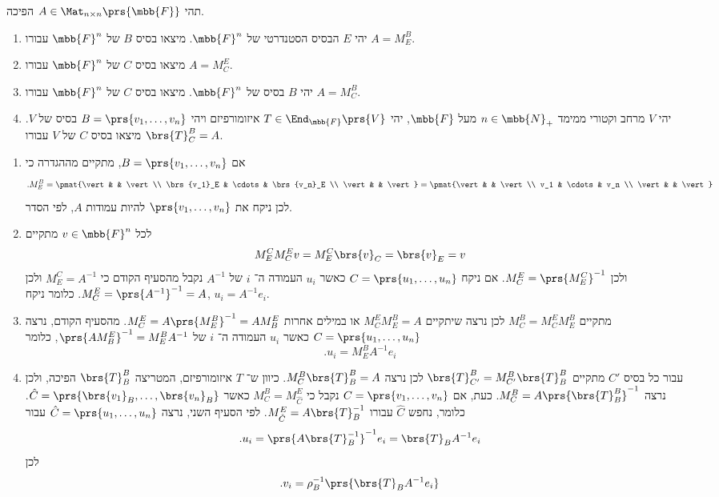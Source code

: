 \documentclass[a4paper,10pt,twoside,openany]{book}
\begin{document}
\begin{exercise}
תהי
$A \in \Mat_{n \times n}\prs{\mbb{F}}$
הפיכה.
\begin{enumerate}
\item יהי
$E$
הבסיס הסטנדרטי של
$\mbb{F}^n$.
מיצאו בסיס
$B$
של
$\mbb{F}^n$
עבורו
$A = M^B_E$.

\item
מיצאו בסיס
$C$
של
$\mbb{F}^n$
עבורו
$A = M^E_C$.

\item
יהי
$B$
בסיס של
$\mbb{F}^n$.
מיצאו בסיס
$C$
של
$\mbb{F}^n$
עבורו
$A = M^B_C$.

\item
יהי
$V$
מרחב וקטורי ממימד
$n \in \mbb{N}_+$
מעל
$\mbb{F}$,
יהי
$T \in \End_{\mbb{F}}\prs{V}$
איזומורפיזם
ויהי
$B = \prs{v_1, \ldots, v_n}$
בסיס של
$V$.
מיצאו בסיס
$C$
של
$V$
עבורו
$\brs{T}^B_C = A$.
\end{enumerate}
\end{exercise}

\begin{solution}
\begin{enumerate}
\item
אם
$B = \prs{v_1, \ldots, v_n}$,
מתקיים מההגדרה כי
\[\text{.} M^B_E = \pmat{\vert & & \vert \\ \brs{v_1}_E & \cdots & \brs{v_n}_E \\ \vert & & \vert} = \pmat{\vert & & \vert \\ v_1 & \cdots & v_n \\ \vert & & \vert}\]
לכן ניקח את
$\prs{v_1, \ldots, v_n}$
להיות עמודות
$A$,
לפי הסדר.

\item
לכל
$v \in \mbb{F}^n$
מתקיים
\[M^C_E M^E_C v = M^C_E \brs{v}_C = \brs{v}_E = v\]
ולכן
$M^E_C = \prs{M^C_E}^{-1}$.
אם ניקח
$C = \prs{u_1, \ldots, u_n}$
כאשר
$u_i$
העמודה ה־%
$i$
של
$A^{-1}$
נקבל מהסעיף הקודם כי
$M^C_E = A^{-1}$
ולכן
$M^E_C = \prs{A^{-1}}^{-1} = A$.
כלומר ניקח,
$u_i = A^{-1} e_i$.

\item
מתקיים
$M^B_C = M^E_C M^B_E$
לכן נרצה שיתקיים
$M^E_C M^B_E = A$
או במילים אחרות
$M^E_C = A \prs{M^B_E}^{-1} = A M^E_B$.
מהסעיף הקודם, נרצה
$C = \prs{u_1, \ldots, u_n}$
כאשר
$u_i$
העמודה ה־%
$i$
של
$\prs{A M^E_B}^{-1} = M^B_E A^{-1}$,
כלומר
\[\text{.} u_i = M^B_E A^{-1} e_i\]

\item
עבור כל בסיס
$C'$
מתקיים
$\brs{T}^B_{C'} = M^B_{C'} \brs{T}^B_B$
לכן נרצה
$M^B_C \brs{T}^B_B = A$.
כיוון ש־%
$T$
איזומורפיזם, המטריצה
$\brs{T}^B_B$
הפיכה, ולכן נרצה
$M^B_C = A \prs{\brs{T}^B_B}^{-1}$.
כעת, אם
$C = \prs{v_1, \ldots, v_n}$
נקבל כי
$M^B_C = M^E_{\hat{C}}$
כאשר
$\hat{C} = \prs{\brs{v_1}_B, \ldots, \brs{v_n}_B}$.
כלומר, נחפש
$\hat{C}$
עבורו
$M^E_{\hat{C}} = A \brs{T}_B^{-1}$.
לפי הסעיף השני, נרצה
$\hat{C} = \prs{u_1, \ldots, u_n}$
עבור
\[\text{.} u_i = \prs{A \brs{T}_B^{-1}}^{-1} e_i = \brs{T}_B A^{-1} e_i\]
לכן
\[\text{.} v_i = \rho_B^{-1} \prs{\brs{T}_B A^{-1} e_i}\]
\end{enumerate}
\end{solution}
\end{document}
